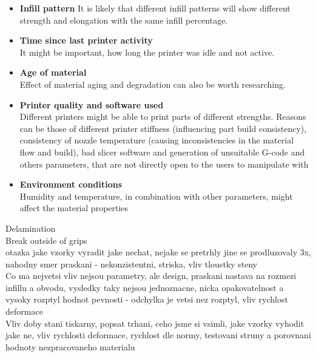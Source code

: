 \documentclass[a4paper, twoside, 11pt]{report}
\begin{document}
\begin{itemize}%
\item \textbf{Infill pattern}
	It is likely that different infill patterns will show different strength and elongation with the same infill percentage.
\item \textbf{Time since last printer activity}\\
	It might be important, how long the printer was idle and not active.
\item \textbf{Age of material}\\
	Effect of material aging and degradation can also be worth researching.
\item \textbf{Printer quality and software used}\\
	Different printers might be able to print parts of different strengths. Reasons can be those of different printer stiffness (influencing part build consistency), consistency of nozzle temperature (causing inconsistencies in the material flow and build), bad slicer software and generation of unsuitable G-code and others parameters, that are not directly open to the users to manipulate with
\item \textbf{Environment conditions}\\
	Humidity and temperature, in combination with other parameters, might affect the material properties
\end{itemize}
Delamination\\
Break outside of grips\\
otazka jake vzorky vyradit jake nechat, nejake se pretrhly jine se prodluzovaly 3x, nahodny smer praskani - nekonzistentni, striska, vliv tloustky steny
\\Co ma nejvetsi vliv nejsou parametry, ale design, praskani nastava na rozmezi infillu a obvodu, vysledky taky nejsou jednoznacne, nicka opakovatelnost a vysoky rozptyl hodnot pevnosti - odchylka je vetsi nez rozptyl, vliv rychlost deformace
\\Vliv doby stani tiskarny, popsat trhani, ceho jsme si vsimli, jake vzorky vyhodit jake ne, vliv rychlosti deformace, rychlost dle normy, testovani struny a porovnani hodnoty nezpracovaneho materialu

\listoftodos
\end{document}
